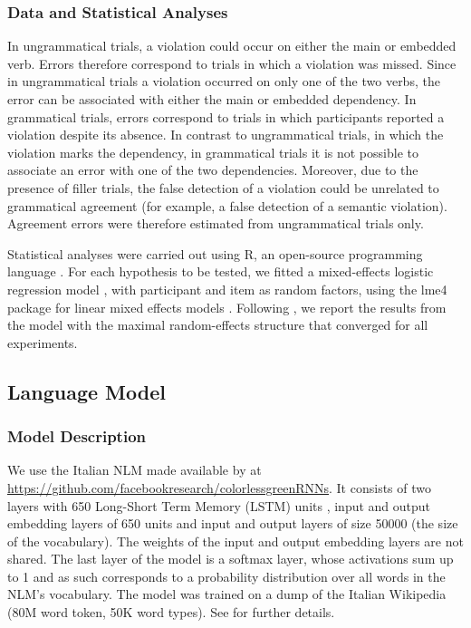 \subsubsection{Data and Statistical Analyses}
In ungrammatical trials, a violation could occur on either the main or embedded verb. Errors therefore correspond to trials in which a violation was missed. Since in ungrammatical trials a violation occurred on only one of the two verbs, the error can be associated with either the main or embedded dependency. In grammatical trials, errors correspond to trials in which participants reported a violation despite its absence. In contrast to ungrammatical trials, in which the violation marks the dependency, in grammatical trials it is not possible to associate an error with one of the two dependencies. Moreover, due to the presence of filler trials, the false detection of a violation could be unrelated to grammatical agreement (for example, a false detection of a semantic violation). Agreement errors were therefore estimated from ungrammatical trials only.

Statistical analyses were carried out using R, an open-source programming language \citep{R}. For each hypothesis to be tested, we fitted a mixed-effects logistic regression model \citep{Jaeger2008}, with participant and item as random factors, using the lme4 package for linear mixed effects models \citep{Bates}. Following \citet{Baayen:etal:2008}, we report the results from the model with the maximal random-effects structure that converged for all experiments. 

\subsection{Language Model}
\subsubsection{Model Description}
We use the Italian NLM made available by \citet{Gulordava:etal:2018} at \url{https://github.com/facebookresearch/colorlessgreenRNNs}.
It consists of two layers with 650 Long-Short Term Memory (LSTM) units \citep{Hochreiter:Schmidhuber:1997}, input and output embedding layers of 650 units and input and output layers of size 50000 (the size of the vocabulary). The weights of the input and output embedding layers are not shared.
The last layer of the model is a softmax layer, whose activations sum up to 1 and as such corresponds to a probability distribution over all words in the NLM's vocabulary. The model was trained on a dump of the Italian Wikipedia (80M word token, 50K word types). See  \citet{Gulordava:etal:2018} for further details.

